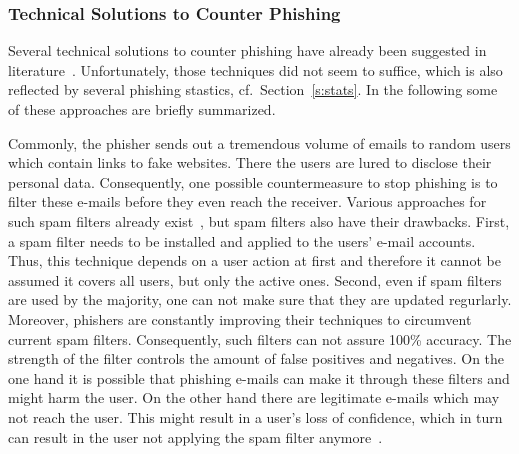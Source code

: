\subsubsection{Technical Solutions to Counter Phishing}

Several technical solutions to counter phishing have already been suggested in literature~\cite{purkait2012phishing}. Unfortunately, those techniques did not seem to suffice, which is also reflected by several phishing stastics, cf.~Section~\ref{s:stats}. In the following some of these approaches are briefly summarized.

\begin{description}[leftmargin=0cm]
	\item[Spam filters] Commonly, the phisher sends out a tremendous volume of emails to random users which contain links to fake websites. There the users are lured to disclose their personal data. Consequently, one possible countermeasure to stop phishing is to filter these e-mails before they even reach the receiver. Various approaches for such spam filters already exist~\cite{bergholz2010new,chandrasekaran2006phishing,fette2007learning}, but spam filters also have their drawbacks. First, a spam filter needs to be installed and applied to the users' e-mail accounts. Thus, this technique depends on a user action at first and therefore it cannot be assumed it covers all users, but only the active ones. Second, even if spam filters are used by the majority, one can not make sure that they are updated regurlarly. Moreover, phishers are constantly improving their techniques to circumvent current spam filters. Consequently, such filters can not assure 100\% accuracy. The strength of the filter controls the amount of false positives and negatives. On the one hand it is possible that phishing e-mails can make it through these filters and might harm the user. On the other hand there are legitimate e-mails which may not reach the user. This might result in a user's loss of confidence, which in turn can result in the user not applying the spam filter anymore~\cite{olivo2011obtaining}.

\end{description}
